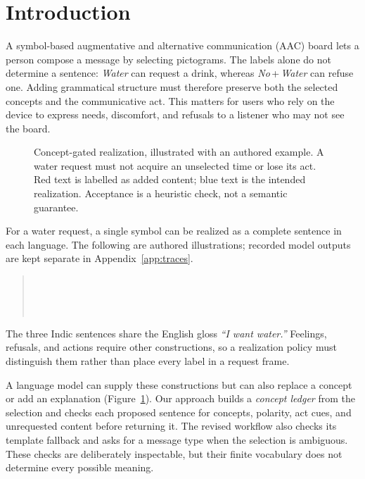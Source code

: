 \section{Introduction}
\label{sec:intro}
A symbol-based augmentative and alternative communication (AAC) board lets a person compose a message by selecting pictograms.
The labels alone do not determine a sentence: \emph{Water} can request a drink, whereas \emph{No}\,+\,\emph{Water} can refuse one.
Adding grammatical structure must therefore preserve both the selected concepts and the communicative act.
This matters for users who rely on the device to express needs, discomfort, and refusals to a listener who may not see the board.

\begin{figure}[t]
\centering

\caption{Concept-gated realization, illustrated with an authored example. A water request must not acquire an unselected time or lose its act. Red text is labelled as added content; blue text is the intended realization. Acceptance is a heuristic check, not a semantic guarantee.}
\label{fig:teaser}
\end{figure}

For a water request, a single symbol can be realized as a complete sentence in each language.
The following are authored illustrations; recorded model outputs are kept separate in Appendix~\ref{app:traces}.
\begin{quote}\small
{}\quad{}\\[2pt]
\quad{}\\[2pt]
\quad{}\\[2pt]
\quad{}
\end{quote}
The three Indic sentences share the English gloss \emph{``I want water.''}
Feelings, refusals, and actions require other constructions, so a realization policy must distinguish them rather than place every label in a request frame.

A language model can supply these constructions but can also replace a concept or add an explanation (Figure~\ref{fig:teaser}).
Our approach builds a \emph{concept ledger} from the selection and checks each proposed sentence for concepts, polarity, act cues, and unrequested content before returning it.
The revised workflow also checks its template fallback and asks for a message type when the selection is ambiguous.
These checks are deliberately inspectable, but their finite vocabulary does not determine every possible meaning.

